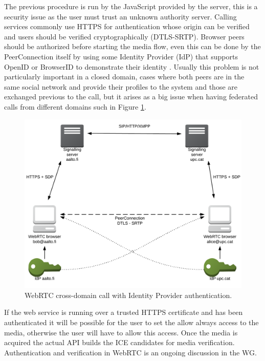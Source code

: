 The previous procedure is run by the JavaScript provided by the server, this is a security issue as the user must trust an unknown authority server. Calling services commonly use HTTPS for authentication whose origin can be verified and users should be verified cryptographically (DTLS-SRTP). Browser peers should be authorized before starting the media flow, even this can be done by the PeerConnection itself by using some Identity Provider (IdP) that supports OpenID or BrowserID to demonstrate their identity \cite{rtcwebSecurityArchIETF}. Usually this problem is not particularly important in a closed domain, cases where both peers are in the same social network and provide their profiles to the system and those are exchanged previous to the call, but it arises as a big issue when having federated calls from different domains such in Figure \ref{fig:idpWebRTCcall}.

 \begin{figure}[h]
  \centering
    \includegraphics[width=1\textwidth]{./figures/idpWebRTCcall.png}
      \caption[WebRTC cross-domain call with Identity Provider authentication]{WebRTC cross-domain call with Identity Provider authentication.}
	\label{fig:idpWebRTCcall}
\end{figure}

If the web service is running over a trusted HTTPS certificate and has been authenticated it will be possible for the user to set the allow always access to the media, otherwise the user will have to allow this access. Once the media is acquired the actual API builds the ICE candidates for media verification. Authentication and verification in WebRTC is an ongoing discussion in the WG.

